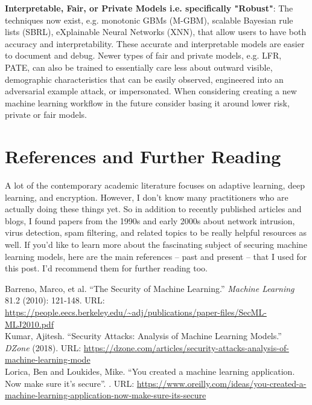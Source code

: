 \documentclass[fleqn]{article}
\begin{document}
\noindent\textbf{Interpretable, Fair, or Private Models i.e. specifically "Robust"}: The techniques now exist, e.g. monotonic GBMs (M-GBM), scalable Bayesian rule lists (SBRL), eXplainable Neural Networks (XNN), that allow users to have both accuracy and interpretability. These accurate and interpretable models are easier to document and debug. Newer types of fair and private models, e.g. LFR, PATE, can also be trained to essentially care less about outward visible, demographic characteristics that can be easily observed, engineered into an adversarial example attack, or impersonated. When considering creating a new machine learning workflow in the future consider basing it around lower risk, private or fair models.\\

\section{References and Further Reading} \label{sec:ref}

A lot of the contemporary academic literature focuses on adaptive learning, deep learning, and encryption. However, I don't know many practitioners who are actually doing these things yet. So in addition to recently published articles and blogs, I found papers from the 1990s and early 2000s about network intrusion, virus detection, spam filtering, and related topics to be really helpful resources as well. If you'd like to learn more about the fascinating subject of securing machine learning models, here are the main references -- past and present -- that I used for this post. I'd recommend them for further reading too.  

\noindent Barreno, Marco, et al. ``The Security of Machine Learning.'' \textit{Machine Learning} 81.2 (2010): 121-148. URL: \url{https://people.eecs.berkeley.edu/~adj/publications/paper-files/SecML-MLJ2010.pdf}\\

\noindent Kumar, Ajitesh. ``Security Attacks: Analysis of Machine Learning Models.'' \textit{DZone} (2018). URL: \url{https://dzone.com/articles/security-attacks-analysis-of-machine-learning-mode}\\

\noindent Lorica, Ben and Loukides, Mike. ``You created a machine learning application. Now make sure it’s secure''. . URL: \url{https://www.oreilly.com/ideas/you-created-a-machine-learning-application-now-make-sure-its-secure}\\
\end{document}
